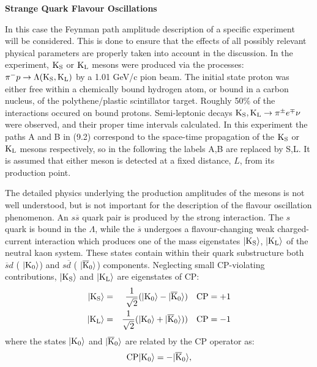 {   \par {\bf \Large Strange Quark Flavour Oscillations}
    \par In this case the Feynman path amplitude description of a specific experiment~\cite{DSDQ} will be considered.
     This is done to ensure that the effects of all possibly relevant physical parameters are properly taken 
    into account in the discussion. In the experiment, ${\rm K_S}$ or ${\rm K_L}$ mesons were produced via the 
    processes: $\pi^- p \rightarrow \Lambda ({\rm K_S},{\rm K_L})$ by a 1.01 GeV/c pion  beam.
    The initial state proton was either free within a chemically bound hydrogen atom, or bound in a carbon nucleus,
    of the polythene/plastic scintillator target. Roughly 50$\%$ of the interactions occured on bound protons.
      Semi-leptonic decays ${\rm K_S},{\rm K_L} \rightarrow \pi^{\pm}e^{\mp} \nu$ were observed, and their 
    proper time intervals calculated. In this experiment the paths A and B in (9.2) correspond to
    the space-time propagation of the  ${\rm K_S}$ or ${\rm K_L}$ mesons respectively, so in the following
    the labels A,B are replaced by S,L. It is assumed that either meson is detected at a fixed distance,
    $L$, from its production point.
    \par   The detailed physics underlying the production amplitudes of the mesons is not well understood,
     but is not important for the description of the flavour oscillation phenomenon. An $s\overline{s}$ quark
   pair is produced by the strong interaction. The $s$ quark is bound in the $\Lambda$, while the $\overline{s}$
    undergoes a flavour-changing weak charged-current interaction which produces one of the mass eigenstates
    $|{\rm K_S}\rangle$, $|{\rm K_L}\rangle$ of the neutral kaon system. These states contain within their
    quark substructure both  $\overline{s}d$ ( $|{\rm K_0}\rangle$) and  $s\overline{d}$ ( $|{\rm \overline{K}_0}\rangle$)
    components. Neglecting small CP-violating contributions,  $|{\rm K_S}\rangle$ and $|{\rm K_L}\rangle$
    are eigenstates of CP:
    \begin{eqnarray}
     |{\rm K_S}\rangle &  = & \frac{1}{\sqrt{2}}(|{\rm K_0}\rangle-|{\rm \overline{K}_0}\rangle)~~~{\rm CP}=+1 \\
     |{\rm K_L}\rangle &  = & \frac{1}{\sqrt{2}}(|{\rm K_0}\rangle+|{\rm \overline{K}_0}\rangle))~~~{\rm CP}=-1
    \end{eqnarray}
  where the states  $|{\rm K_0}\rangle$ and  $|{\rm \overline{K}_0}\rangle$ are related by the CP operator as:
   \[{\rm CP} |{\rm K_0}\rangle = - |{\rm \overline{K}_0}\rangle,
\]}
